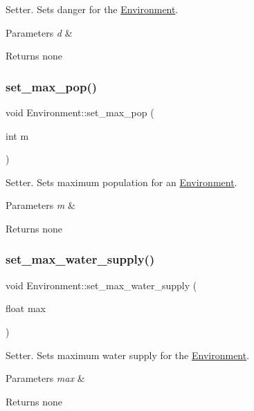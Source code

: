 Setter. Sets danger for the \hyperlink{class_environment}{Environment}. 
\begin{DoxyParams}{Parameters}
{\em d} & \\
\hline
\end{DoxyParams}
\begin{DoxyReturn}{Returns}
none 
\end{DoxyReturn}
\mbox{\label{class_environment_a12323e6c706898f120b3297582e09121}} 
\subsubsection{\texorpdfstring{set\+\_\+max\+\_\+pop()}{set\_max\_pop()}}
{\footnotesize\ttfamily void Environment\+::set\+\_\+max\+\_\+pop (\begin{DoxyParamCaption}\item[{int}]{m }\end{DoxyParamCaption})}

Setter. Sets maximum population for an \hyperlink{class_environment}{Environment}. 
\begin{DoxyParams}{Parameters}
{\em m} & \\
\hline
\end{DoxyParams}
\begin{DoxyReturn}{Returns}
none 
\end{DoxyReturn}
\mbox{\label{class_environment_a5b9b1df176ffa5a48c672fd6739b4d90}} 
\subsubsection{\texorpdfstring{set\+\_\+max\+\_\+water\+\_\+supply()}{set\_max\_water\_supply()}}
{\footnotesize\ttfamily void Environment\+::set\+\_\+max\+\_\+water\+\_\+supply (\begin{DoxyParamCaption}\item[{float}]{max }\end{DoxyParamCaption})}

Setter. Sets maximum water supply for the \hyperlink{class_environment}{Environment}. 
\begin{DoxyParams}{Parameters}
{\em max} & \\
\hline
\end{DoxyParams}
\begin{DoxyReturn}{Returns}
none 
\end{DoxyReturn}
\mbox{\label{class_environment_a77ef203c0aed27b0eed00d5b0d714993}} 

